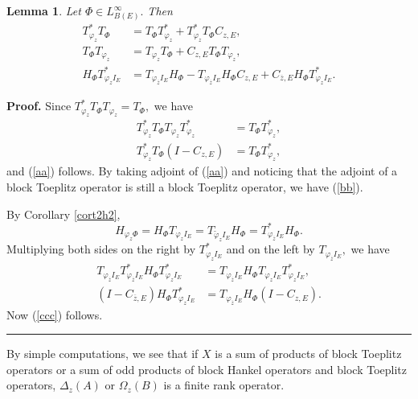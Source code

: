\documentclass{article}%
\newtheorem{lemma}[theorem]{Lemma}
\newenvironment{proof}[1][Proof]{\noindent\textbf{#1.} }{\ \rule{0.5em}{0.5em}}
\begin{document}
\begin{lemma}
Let $\Phi\in L_{B(E)}^{\infty}.$ Then
\begin{align}
T_{\varphi_{z}}^{\ast}T_{\Phi}  &  =T_{\Phi}T_{\varphi_{z}}^{\ast}%
+T_{\varphi_{z}}^{\ast}T_{\Phi}C_{z,E},\label{aa}\\
T_{\Phi}T_{\varphi_{z}}  &  =T_{\varphi_{z}}T_{\Phi}+C_{z,E}T_{\Phi}%
T_{\varphi_{z}},\label{bb}\\
H_{\Phi}T_{\varphi_{z}I_{E}}^{\ast}  &  =T_{\varphi_{\overline{z}}I_{E}%
}H_{\Phi}-T_{\varphi_{\overline{z}}I_{E}}H_{\Phi}C_{z,E}+C_{\overline{z}%
,E}H_{\Phi}T_{\varphi_{z}I_{E}}^{\ast}. \label{ccc}%
\end{align}

\end{lemma}

\begin{proof}
Since $T_{\varphi_{z}}^{\ast}T_{\Phi}T_{\varphi_{z}}=T_{\Phi},$ we have%
\begin{align*}
T_{\varphi_{z}}^{\ast}T_{\Phi}T_{\varphi_{z}}T_{\varphi_{z}}^{\ast}  &
=T_{\Phi}T_{\varphi_{z}}^{\ast},\\
T_{\varphi_{z}}^{\ast}T_{\Phi}\left(  I-C_{z,E}\right)   &  =T_{\Phi
}T_{\varphi_{z}}^{\ast},
\end{align*}
and (\ref{aa}) follows. By taking adjoint of (\ref{aa}) and noticing that the
adjoint of a block Toeplitz operator is still a block Toeplitz operator, we
have (\ref{bb}).

By Corollary \ref{cort2h2},
\[
H_{\varphi_{z}\Phi}=H_{\Phi}T_{\varphi_{z}I_{E}}=T_{\widetilde{\varphi}%
_{z}I_{E}}H_{\Phi}=T_{\varphi_{\overline{z}}I_{E}}^{\ast}H_{\Phi}.
\]
Multiplying both sides on the right by $T_{\varphi_{z}I_{E}}^{\ast}$ and on
the left by $T_{\varphi_{\overline{z}}I_{E}},$ we have%
\begin{align*}
T_{\varphi_{\overline{z}}I_{E}}T_{\varphi_{\overline{z}}I_{E}}^{\ast}H_{\Phi
}T_{\varphi_{z}I_{E}}^{\ast}  &  =T_{\varphi_{\overline{z}}I_{E}}H_{\Phi
}T_{\varphi_{z}I_{E}}T_{\varphi_{z}I_{E}}^{\ast},\\
(I-C_{\overline{z},E})H_{\Phi}T_{\varphi_{z}I_{E}}^{\ast}  &  =T_{\varphi
_{\overline{z}}I_{E}}H_{\Phi}(I-C_{z,E}).
\end{align*}
Now (\ref{ccc}) follows.
\end{proof}

By simple computations, we see that if $X$ is a sum of products of block
Toeplitz operators or a sum of odd products of block Hankel operators and
block Toeplitz operators, $\Delta_{z}(A)$ or $\Omega_{z}(B)$ is a finite rank operator.
\end{document}
